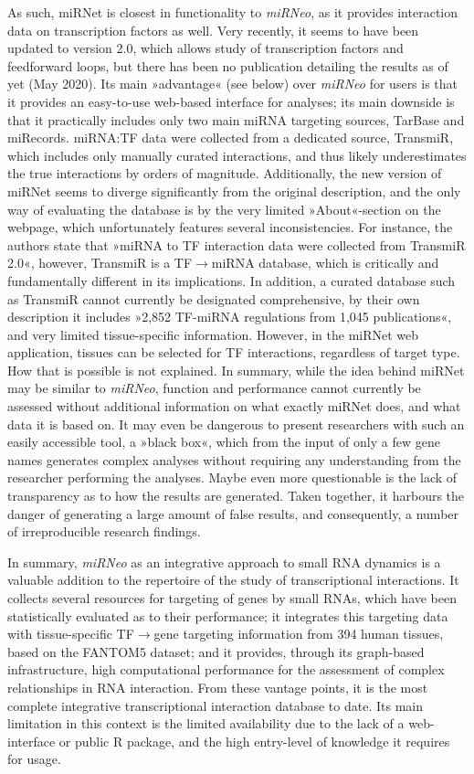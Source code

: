 As such, miRNet\cite{Fan2016} is closest in functionality to \emph{miRNeo}, as it provides interaction data on transcription factors as well. Very recently, it seems to have been updated to version 2.0, which allows study of transcription factors and feedforward loops, but there has been no publication detailing the results as of yet (May 2020). Its main »advantage« (see below) over \emph{miRNeo} for users is that it provides an easy-to-use web-based interface for analyses; its main downside is that it practically includes only two main miRNA targeting sources, TarBase and miRecords. miRNA:TF data were collected from a dedicated source, TransmiR, which includes only manually curated interactions, and thus likely underestimates the true interactions by orders of magnitude. Additionally, the new version of miRNet seems to diverge significantly from the original description,\cite{Fan2016} and the only way of evaluating the database is by the very limited »About«-section on the webpage, which unfortunately features several inconsistencies. For instance, the authors state that »miRNA to TF interaction data were collected from TransmiR 2.0«, however, TransmiR is a TF$\to$miRNA database, which is critically and fundamentally different in its implications. In addition, a curated database such as TransmiR cannot currently be designated comprehensive, by their own description it includes »2,852 TF-miRNA regulations from 1,045 publications«, and very limited tissue-specific information. However, in the miRNet web application, tissues can be selected for TF interactions, regardless of target type. How that is possible is not explained. In summary, while the idea behind miRNet may be similar to \emph{miRNeo}, function and performance cannot currently be assessed without additional information on what exactly miRNet does, and what data it is based on. It may even be dangerous to present researchers with such an easily accessible tool, a »black box«, which from the input of only a few gene names generates complex analyses without requiring any understanding from the researcher performing the analyses. Maybe even more questionable is the lack of transparency as to how the results are generated. Taken together, it harbours the danger of generating a large amount of false results, and consequently, a number of irreproducible research findings.

In summary, \emph{miRNeo} as an integrative approach to small RNA dynamics is a valuable addition to the repertoire of the study of transcriptional interactions. It collects several resources for targeting of genes by small RNAs, which have been statistically evaluated as to their performance; it integrates this targeting data with tissue-specific TF$\to$gene targeting information from 394 human tissues, based on the \mbox{FANTOM5} dataset; and it provides, through its graph-based infrastructure, high computational performance for the assessment of complex relationships in RNA interaction. From these vantage points, it is the most complete integrative transcriptional interaction database to date. Its main limitation in this context is the limited availability due to the lack of a web-interface or public R package, and the high entry-level of knowledge it requires for usage.

